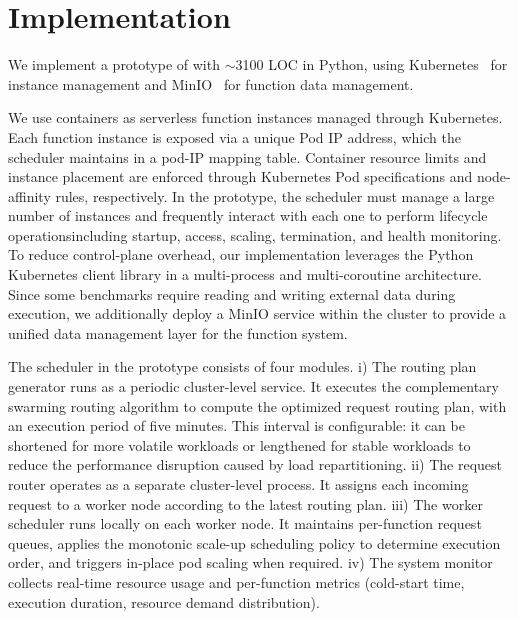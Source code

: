\section{Implementation}
\label{sec:implementation}

We implement a prototype of \sysname with $\sim$3100 LOC in Python, using 
Kubernetes~\cite{k8s} for instance management and MinIO~\cite{MinIO} for function
data management.

 We use containers as serverless function instances
managed through Kubernetes. Each function instance is exposed
via a unique Pod IP address, which the scheduler maintains in a pod-IP mapping 
table. Container resource limits and instance placement are enforced through 
Kubernetes Pod specifications and node-affinity rules, respectively. In the 
prototype, the scheduler must manage a large number of instances and frequently 
interact with each one to perform lifecycle operations\textemdash including startup, access, 
scaling, termination, and health monitoring. To reduce control-plane overhead, 
our implementation leverages the Python Kubernetes client library in a multi-process 
and multi-coroutine architecture. Since some benchmarks require reading and
writing external data during execution, we additionally deploy a MinIO service
within the cluster to provide a unified data management layer for the function 
system.

 The scheduler in the prototype consists of four modules.
i) The routing plan generator runs as a periodic cluster-level service. It executes the complementary swarming routing algorithm to compute the optimized request routing plan, with an execution period of five minutes. This interval is configurable: it can be shortened for more volatile workloads or lengthened for stable workloads to reduce the performance disruption caused by load repartitioning.
ii) The request router operates as a separate cluster-level process. It assigns each incoming request to a worker node according to the latest routing plan.
iii) The worker scheduler runs locally on each worker node. It maintains per-function request queues, applies the monotonic scale-up scheduling policy to determine execution order, and triggers in-place pod scaling when required.
iv) The system monitor collects real-time resource usage and per-function metrics (\eg cold-start time, execution duration, resource demand distribution). 
